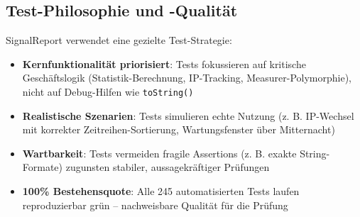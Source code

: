 \subsection{Test-Philosophie und -Qualität}
SignalReport verwendet eine gezielte Test-Strategie:
\begin{itemize}
    \item \textbf{Kernfunktionalität priorisiert}: Tests fokussieren auf kritische Geschäftslogik (Statistik-Berechnung, IP-Tracking, Measurer-Polymorphie), nicht auf Debug-Hilfen wie \texttt{toString()}
    \item \textbf{Realistische Szenarien}: Tests simulieren echte Nutzung (z. B. IP-Wechsel mit korrekter Zeitreihen-Sortierung, Wartungsfenster über Mitternacht)
    \item \textbf{Wartbarkeit}: Tests vermeiden fragile Assertions (z. B. exakte String-Formate) zugunsten stabiler, aussagekräftiger Prüfungen
    \item \textbf{100\% Bestehensquote}: Alle 245 automatisierten Tests laufen reproduzierbar grün -- nachweisbare Qualität für die Prüfung
\end{itemize}
